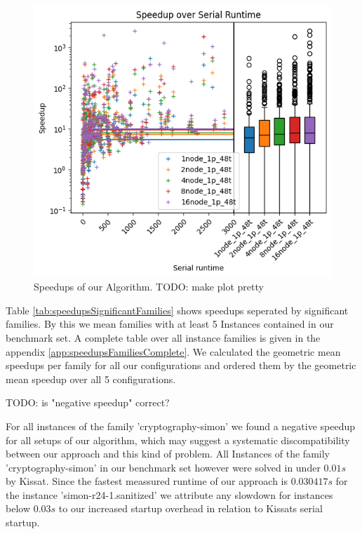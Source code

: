 \documentclass[12pt,a4paper,twoside]{scrartcl}
\numberwithin{equation}{section}
\begin{document}
\begin{figure}
  \center
  \includegraphics{plots/speedups_gim.png}
  \caption{Speedups of our Algorithm. TODO: make plot pretty}
  \label{fig:speedups}
\end{figure}


Table \ref{tab:speedupsSignificantFamilies} shows speedups seperated by significant families. By this we mean families with at least 5 Instances contained in our benchmark set. A complete table over all instance families is given in the appendix \ref{app:speedupsFamiliesComplete}. We calculated the geometric mean speedups per family for all our configurations and ordered them by the geometric mean speedup over all 5 configurations.

TODO: is "negative speedup" correct?

For all instances of the family 'cryptography-simon' we found a negative speedup for all setups of our algorithm, which may suggest a systematic discompatibility between our approach and this kind of problem. All Instances of the family 'cryptography-simon' in our benchmark set however were solved in under $0.01s$ by Kissat. Since the fastest meassured runtime of our approach is $0.030417s$ for the instance 'simon-r24-1.sanitized' we attribute any slowdown for instances below $0.03s$ to our increased startup overhead in relation to Kissats serial startup.
\end{document}
